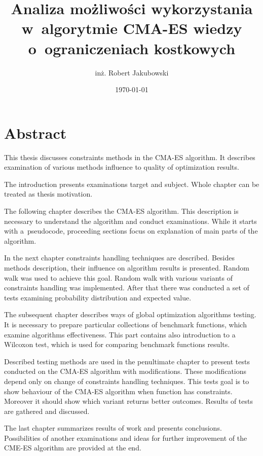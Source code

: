 \documentclass{mini}
\title{Analiza możliwości wykorzystania w~algorytmie CMA-ES wiedzy o~ograniczeniach kostkowych}
\author{inż. Robert Jakubowski}
\date{\today}
\begin{document}
\raggedbottom
{}

\section*{Abstract}
\hspace{3,4ex}This thesis discusses constraints methods in the CMA-ES algorithm. It describes examination of various methods influence to quality of optimization results.

The introduction presents examinations target and subject. Whole chapter can be treated as thesis motivation.

The following chapter describes the CMA-ES algorithm. This description is necessary to understand the algorithm and conduct examinations. While it starts with a~pseudocode, proceeding sections focus on explanation of main parts of the algorithm.

In the next chapter constraints handling techniques are described. Besides methods description, their influence on algorithm results is presented. Random walk was used to achieve this goal. Random walk with various variants of constraints handling was implemented. After that there was conducted a set of tests examining probability distribution and expected value.

The subsequent chapter describes ways of global optimization algorithms testing. It is necessary to prepare particular collections of benchmark functions, which examine algorithms effectiveness. This part contains also introduction to a Wilcoxon test, which is used for comparing benchmark functions results.

Described testing methods are used in the penultimate chapter to present tests conducted on the CMA-ES algorithm with modifications. These modifications depend only on change of constraints handling techniques. This tests goal is to show behaviour of the CMA-ES algorithm when function has constraints. Moreover it should show which variant returns better outcomes. Results of tests are gathered and discussed.

The last chapter summarizes results of work and presents conclusions. Possibilities of another examinations and ideas for further improvement of the CME-ES algorithm are provided at the end.

\pagebreak
\end{document}
